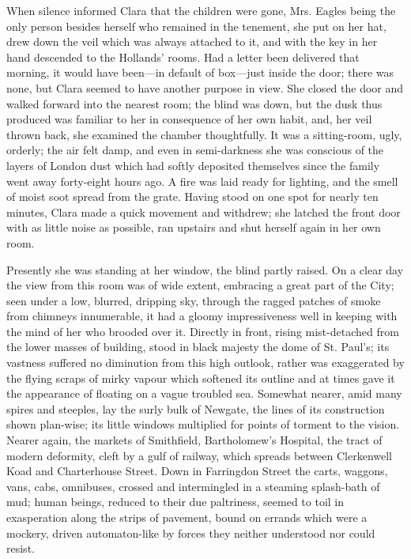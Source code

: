 When silence informed Clara that the children were gone, Mrs. Eagles
being the only person besides herself who remained in the tenement, she
put on her hat, drew down the veil which was always attached to it, and
with the key in her hand descended to the Hollands' rooms. Had a letter
been delivered that morning, it would have been---in default of
box---just inside the door; there was none, but Clara seemed to have
another purpose in view. She closed the door and walked forward into the
nearest room; the blind was down, but the dusk thus produced was
familiar to her in consequence of her own habit, and, her veil thrown
back, she examined the chamber thoughtfully. It was a sitting-room,
ugly, orderly; the air felt damp, and even in semi-darkness she was
conscious of the layers of London dust which had softly deposited
themselves since the family went away forty-eight hours ago. A
{\protect\hypertarget{72}{}{}}fire was laid ready for lighting, and the
smell of moist soot spread from the grate. Having stood on one spot for
nearly ten minutes, Clara made a quick movement and withdrew; she
latched the front door with as little noise as possible, ran upstairs
and shut herself again in her own room.

Presently she was standing at her window, the blind partly raised. On a
clear day the view from this room was of wide extent, embracing a great
part of the City; seen under a low, blurred, dripping sky, through the
ragged patches of smoke from chimneys innumerable, it had a gloomy
impressiveness well in keeping with the mind of her who brooded over it.
Directly in front, rising mist-detached from the lower masses of
building, stood in black majesty the dome of St. Paul's; its vastness
suffered no diminution from this high outlook, rather was exaggerated by
the flying scraps of mirky vapour which softened its outline and at
times gave it the appearance of floating on a vague troubled sea.
Somewhat nearer, amid many spires and steeples, lay the surly bulk of
Newgate, the lines of its construction shown plan-wise; its
{\protect\hypertarget{73}{}{}}little windows multiplied for points of
torment to the vision. Nearer again, the markets of Smithfield,
Bartholomew's Hospital, the tract of modern deformity, cleft by a gulf
of railway, which spreads between Clerkenwell Koad and Charterhouse
Street. Down in Farringdon Street the carts, waggons, vans, cabs,
omnibuses, crossed and intermingled in a steaming splash-bath of mud;
human beings, reduced to their due paltriness, seemed to toil in
exasperation along the strips of pavement, bound on errands which were a
mockery, driven automaton-like by forces they neither understood nor
could resist.

